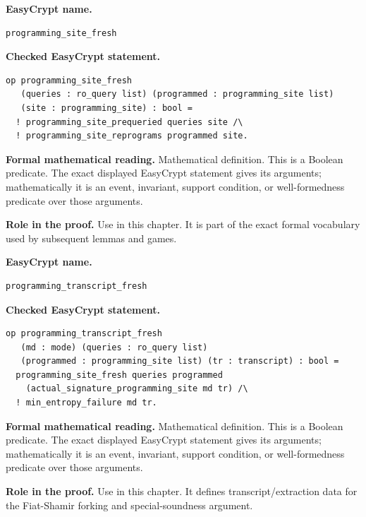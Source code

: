 \begin{formaldefinition}
\noindent\textbf{EasyCrypt name.}
\begin{lstlisting}[language=EasyCrypt,basicstyle=\ttfamily\scriptsize]
programming_site_fresh
\end{lstlisting}
\noindent\textbf{Checked EasyCrypt statement.}
\begin{lstlisting}[language=EasyCrypt,basicstyle=\ttfamily\scriptsize]
op programming_site_fresh
   (queries : ro_query list) (programmed : programming_site list)
   (site : programming_site) : bool =
  ! programming_site_prequeried queries site /\
  ! programming_site_reprograms programmed site.
\end{lstlisting}
\noindent\textbf{Formal mathematical reading.}
Mathematical definition. This is a Boolean predicate.  The exact displayed EasyCrypt statement gives its arguments; mathematically it is an event, invariant, support condition, or well-formedness predicate over those arguments.

\noindent\textbf{Role in the proof.}
Use in this chapter. It is part of the exact formal vocabulary used by subsequent lemmas and games.

\end{formaldefinition}

\begin{formaldefinition}
\noindent\textbf{EasyCrypt name.}
\begin{lstlisting}[language=EasyCrypt,basicstyle=\ttfamily\scriptsize]
programming_transcript_fresh
\end{lstlisting}
\noindent\textbf{Checked EasyCrypt statement.}
\begin{lstlisting}[language=EasyCrypt,basicstyle=\ttfamily\scriptsize]
op programming_transcript_fresh
   (md : mode) (queries : ro_query list)
   (programmed : programming_site list) (tr : transcript) : bool =
  programming_site_fresh queries programmed
    (actual_signature_programming_site md tr) /\
  ! min_entropy_failure md tr.
\end{lstlisting}
\noindent\textbf{Formal mathematical reading.}
Mathematical definition. This is a Boolean predicate.  The exact displayed EasyCrypt statement gives its arguments; mathematically it is an event, invariant, support condition, or well-formedness predicate over those arguments.

\noindent\textbf{Role in the proof.}
Use in this chapter. It defines transcript/extraction data for the Fiat-Shamir forking and special-soundness argument.

\end{formaldefinition}

